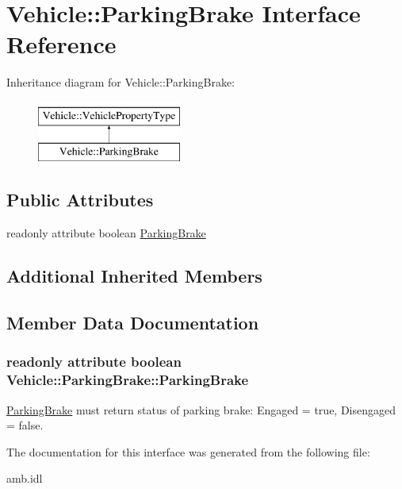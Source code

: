 \hypertarget{interfaceVehicle_1_1ParkingBrake}{\section{Vehicle\-:\-:Parking\-Brake Interface Reference}
\label{interfaceVehicle_1_1ParkingBrake}
}
Inheritance diagram for Vehicle\-:\-:Parking\-Brake\-:\begin{figure}[H]
\begin{center}
\leavevmode
\includegraphics[height=2.000000cm]{interfaceVehicle_1_1ParkingBrake}
\end{center}
\end{figure}
\subsection*{Public Attributes}
\begin{DoxyCompactItemize}
\item 
readonly attribute boolean \hyperlink{interfaceVehicle_1_1ParkingBrake_af73046234eba05a8200cb5b6cf6800bf}{Parking\-Brake}
\end{DoxyCompactItemize}
\subsection*{Additional Inherited Members}


\subsection{Member Data Documentation}
\hypertarget{interfaceVehicle_1_1ParkingBrake_af73046234eba05a8200cb5b6cf6800bf}{
\subsubsection[{Parking\-Brake}]{\setlength{\rightskip}{0pt plus 5cm}readonly attribute boolean Vehicle\-::\-Parking\-Brake\-::\-Parking\-Brake}}\label{interfaceVehicle_1_1ParkingBrake_af73046234eba05a8200cb5b6cf6800bf}
\hyperlink{interfaceVehicle_1_1ParkingBrake}{Parking\-Brake} must return status of parking brake\-: Engaged = true, Disengaged = false. 

The documentation for this interface was generated from the following file\-:\begin{DoxyCompactItemize}
\item 
amb.\-idl\end{DoxyCompactItemize}
